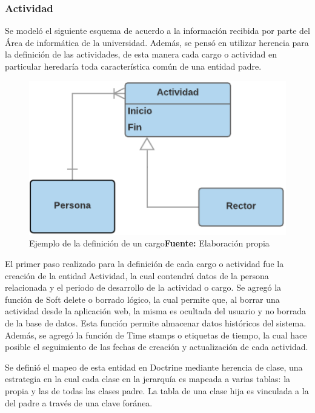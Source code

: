 \documentclass{article}
\begin{document}
\subsubsection{Actividad}%
\label{ssub:actividad}
Se modeló el siguiente esquema de acuerdo a la información recibida por parte del Área de informática de la universidad\@.
Además, se pensó en utilizar herencia para la definición de las actividades, de esta manera cada cargo o actividad en particular
heredaría toda característica común de una entidad padre.

\begin{figure}[h]
    \includegraphics[scale=1]{image/actividad-modelo.png}
    \caption{Ejemplo de la definición de un cargo\newline \textbf{Fuente:} Elaboración propia}%
    \label{fig:image/actividad-modelo}
\end{figure}
El primer paso realizado para la definición de cada cargo o actividad fue la creación de la entidad Actividad, la cual contendrá
datos de la persona relacionada y el periodo de desarrollo de la actividad o cargo\@.
Se agregó la función de Soft delete o borrado lógico, la cual permite que, al borrar una actividad desde la aplicación web,
la misma es ocultada del usuario y no borrada de la base de datos\@. Esta función permite almacenar datos históricos del sistema\@.
Además, se agregó la función de Time stamps o etiquetas de tiempo, la cual hace posible el seguimiento de las fechas de creación
y actualización de cada actividad.


Se definió el mapeo de esta entidad en Doctrine mediante herencia de clase, una estrategia en la cual cada clase en la jerarquía es mapeada a varias tablas:
la propia y las de todas las clases padre. La tabla de una clase hija es vinculada a la del padre a través de una clave foránea.
\end{document}
